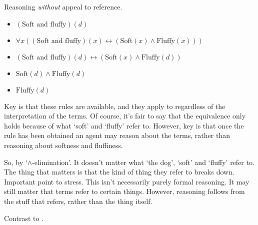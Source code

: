\begin{note}[Example, \nr{}]
  Reasoning \emph{without} appeal to reference.

  \begin{itemize}
  \item \((\text{Soft and fluffy})(d)\)
  \item \(\forall x((\text{Soft and fluffy})(x) \leftrightarrow (\text{Soft}(x) \land \text{Fluffy}(x)))\)
  \item \((\text{Soft and fluffy})(d) \leftrightarrow (\text{Soft}(x) \land \text{Fluffy}(d))\)
  \item \(\text{Soft}(d) \land \text{Fluffy}(d)\)
  \item \(\text{Fluffy}(d)\)
  \end{itemize}

  Key is that these rules are available, and they apply to regardless of the interpretation of the terms.
  Of course, it's fair to say that the equivalence only holds because of what `soft' and `fluffy' refer to.
  However, key is that once the rule has been obtained an agent may reason about the terms, rather than reasoning about softness and fluffiness.


  So, by `\(\land\)-elimination'.
  It doesn't matter what `the dog', `soft' and `fluffy' refer to.
  The thing that matters is that the kind of thing they refer to breaks down.
  Important point to stress.
  This isn't necessarily purely formal reasoning.
  It may still matter that terms refer to certain things.
  However, reasoning follows from the stuff that refers, rather than the thing itself.

  Contrast to \ur{}.
\end{note}


